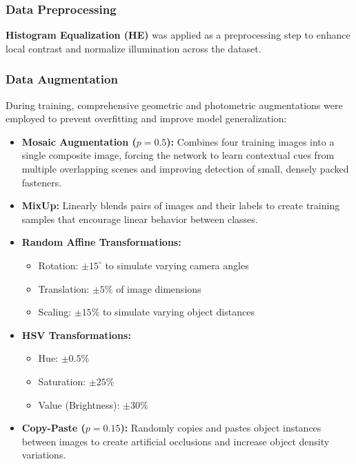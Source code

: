 \subsubsection{Data Preprocessing}
\textbf{Histogram Equalization (HE)} was applied as a preprocessing step to enhance local contrast and normalize illumination across the dataset.

\subsubsection{Data Augmentation}
During training, comprehensive geometric and photometric augmentations were employed to prevent overfitting and improve model generalization:

\begin{itemize}
    \item \textbf{Mosaic Augmentation ($p=0.5$):} Combines four training images into a single composite image, forcing the network to learn contextual cues from multiple overlapping scenes and improving detection of small, densely packed fasteners.
    
    \item \textbf{MixUp:} Linearly blends pairs of images and their labels to create training samples that encourage linear behavior between classes.
    
    \item \textbf{Random Affine Transformations:}
    \begin{itemize}
        \item Rotation: $\pm 15^\circ$ to simulate varying camera angles
        \item Translation: $\pm 5\%$ of image dimensions
        \item Scaling: $\pm 15\%$ to simulate varying object distances
    \end{itemize}
    
    \item \textbf{HSV Transformations:}
    \begin{itemize}
        \item Hue: $\pm 0.5\%$
        \item Saturation: $\pm 25\%$
        \item Value (Brightness): $\pm 30\%$
    \end{itemize}
    
    \item \textbf{Copy-Paste ($p=0.15$):} Randomly copies and pastes object instances between images to create artificial occlusions and increase object density variations.
\end{itemize}

